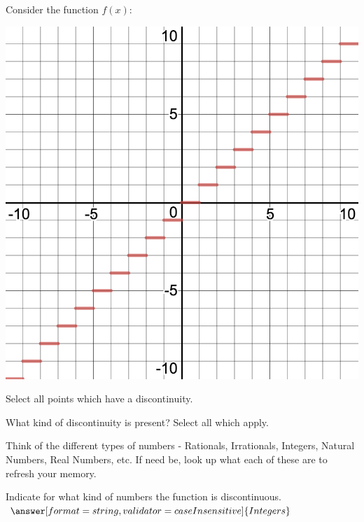 \documentclass{ximera}
\begin{document}
\begin{question}
Consider the function $f(x)$:
\begin{image}
\includegraphics{continuity6}
\end{image}
Select all points which have a discontinuity.

\begin{selectAll}
\end{selectAll}

What kind of discontinuity is present? Select all which apply.

\begin{selectAll}
\end{selectAll}

\end{question}
\begin{question}
\begin{hint}
Think of the different types of numbers - Rationals, Irrationals, Integers, Natural Numbers, Real Numbers, etc. If need be, look up what each of these are to refresh your memory.
\end{hint}
Indicate for what kind of numbers the function is discontinuous.
$\answer[format=string,validator=caseInsensitive]{Integers}$
\end{question}
\end{document}
